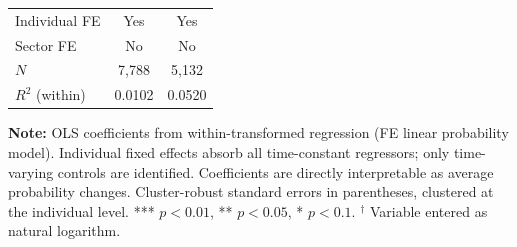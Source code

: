\begin{table}[htbp]
\begin{tabular*}{\linewidth}{ @{\extracolsep{\fill}} @{}lcc@{} @{} }
  Individual FE & Yes & Yes \\
  Sector FE     & No & No \\
  \midrule
  $N$ & 7,788 & 5,132 \\
  $R^2$ (within) & 0.0102 & 0.0520 \\
  \bottomrule
\end{tabular*}
\smallskip
\begin{minipage}{\linewidth}
\footnotesize
\textbf{Note:} OLS coefficients from within-transformed regression (FE linear probability model). Individual fixed effects absorb all time-constant regressors; only time-varying controls are identified. Coefficients are directly interpretable as average probability changes. Cluster-robust standard errors in parentheses, clustered at the individual level. *** $p<0.01$, ** $p<0.05$, * $p<0.1$. $^\dagger$ Variable entered as natural logarithm.
\end{minipage}
\end{table}
